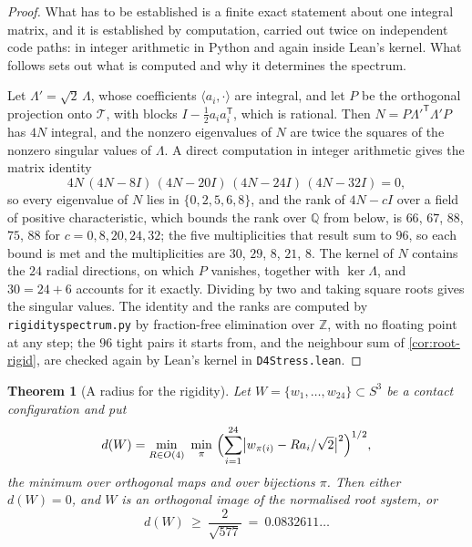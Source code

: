 \documentclass[11pt,reqno]{amsart}
\renewcommand{\_}{\origunderscore\allowbreak}
\numberwithin{equation}{section}
\theoremstyle{plain}
\newtheorem{thm}{Theorem}[section]
\theoremstyle{definition}
\theoremstyle{remark}
\begin{document}
\begin{proof}
What has to be established is a finite exact statement about one
integral matrix, and it is established by computation, carried out twice
on independent code paths: in integer arithmetic in Python and again
inside Lean's kernel. What follows sets out what is computed and why it
determines the spectrum.

Let $\Lambda'=\sqrt2\,\Lambda$, whose coefficients $\langle a_i,\cdot\rangle$
are integral, and let $P$ be the orthogonal projection onto $\mathcal{T}$, with
blocks $I-\tfrac12a_ia_i^{\mathsf T}$, which is rational. Then
$N=P\Lambda'^{\mathsf T}\Lambda'P$ has $4N$ integral, and the nonzero
eigenvalues of $N$ are twice the squares of the nonzero singular values
of $\Lambda$. A direct computation in integer arithmetic gives the
matrix identity
\[
  4N\,(4N-8I)\,(4N-20I)\,(4N-24I)\,(4N-32I)=0 ,
\]
so every eigenvalue of $N$ lies in $\{0,2,5,6,8\}$, and the rank of
$4N-cI$ over a field of positive characteristic, which bounds the rank
over $\mathbb{Q}$ from below, is $66$, $67$, $88$, $75$, $88$ for
$c=0,8,20,24,32$; the five multiplicities that result sum to $96$, so
each bound is met and the multiplicities are $30$, $29$, $8$, $21$, $8$.
The kernel of $N$ contains the $24$ radial directions, on which $P$
vanishes, together with $\ker\Lambda$, and $30=24+6$ accounts for it
exactly. Dividing by two and taking square roots gives the singular
values. The identity and the ranks are computed by
\texttt{rigidity\_spectrum.py} by fraction-free elimination over
$\mathbb{Z}$, with no floating point at any step; the $96$ tight pairs it
starts from, and the neighbour sum of \cref{cor:root-rigid}, are checked
again by Lean's kernel in \texttt{D4Stress.lean}.
\end{proof}

\begin{thm}[A radius for the rigidity]\label{thm:local-uniqueness}
Let $W=\{w_1,\dots,w_{24}\}\subset S^3$ be a contact configuration and
put
\[
  d(W)=\min_{R\in O(4)}\ \min_{\pi}\
  \Bigl(\sum_{i=1}^{24}\bigl|w_{\pi(i)}-Ra_i/\sqrt2\bigr|^2\Bigr)^{1/2},
\]
the minimum over orthogonal maps and over bijections $\pi$. Then either
$d(W)=0$, and $W$ is an orthogonal image of the normalised root system,
or
\[
  d(W)\ \ge\ \frac{2}{\sqrt{577}}\ =\ 0.0832611\ldots
\]
\end{thm}
\end{document}

